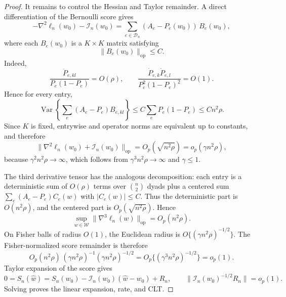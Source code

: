 \documentclass[10pt,a4paper]{amsart}
\providecommand{\Var}{\operatorname{Var}}
\providecommand{\calI}{\mathcal I}
\providecommand{\calW}{\mathcal W}
\providecommand{\op}{\operatorname{op}}
\begin{document}
\begin{proof}
It remains to control the Hessian and Taylor remainder.  A direct
differentiation of the Bernoulli score gives
\[
  -\nabla^2\ell_n(w_0)-\calI_n(w_0)
  =
  \sum_{e\in\mathcal D_n}(A_e-P_e(w_0))\,B_e(w_0),
\]
where each \(B_e(w_0)\) is a \(K\times K\) matrix satisfying
\[
  \|B_e(w_0)\|_{\op}\le C.
\]
Indeed,
\[
  \frac{\ddot P_{e,kl}}{P_e(1-P_e)}=O(\rho),
  \qquad
  \frac{\dot P_{e,k}\dot P_{e,l}}{P_e^2(1-P_e)^2}=O(1).
\]
Hence for every entry,
\[
  \Var\!\left\{\sum_e(A_e-P_e)B_{e,kl}\right\}
  \le
  C\sum_eP_e(1-P_e)
  \le
  Cn^2\rho.
\]
Since \(K\) is fixed, entrywise and operator norms are equivalent up to
constants, and therefore
\[
  \|\nabla^2\ell_n(w_0)+\calI_n(w_0)\|_{\op}
  =
  O_p(\sqrt{n^2\rho})
  =
  o_p(\gamma n^2\rho),
\]
because \(\gamma^2n^2\rho\to\infty\), which follows from
\(\gamma^3n^2\rho\to\infty\) and \(\gamma\le1\).

The third derivative tensor has the analogous decomposition: each entry
is a deterministic sum of \(O(\rho)\) terms over \(\binom{n}{2}\) dyads plus a
centered sum \(\sum_e(A_e-P_e)C_e(w)\) with \(|C_e(w)|\le C\).  Thus the
deterministic part is \(O(n^2\rho)\), and the centered part is
\(O_p(\sqrt{n^2\rho})\).  Hence
\[
  \sup_{w\in\calW}\|\nabla^3\ell_n(w)\|_{\op}
  =
  O_p(n^2\rho).
\]
On Fisher balls of radius \(O(1)\), the Euclidean radius is
\(O\{(\gamma n^2\rho)^{-1/2}\}\).  The Fisher-normalized score remainder
is therefore
\[
  O_p(n^2\rho)\,(\gamma n^2\rho)^{-1}
  (\gamma n^2\rho)^{-1/2}
  =
  O_p\{(\gamma^3n^2\rho)^{-1/2}\}
  =
  o_p(1).
\]
Taylor expansion of the score gives
\[
  0=S_n(\widehat w)
  =
  S_n(w_0)-\calI_n(w_0)(\widehat w-w_0)+R_n,
  \qquad
  \|\calI_n(w_0)^{-1/2}R_n\|=o_p(1).
\]
Solving proves the linear expansion, rate, and CLT.
\end{proof}
\end{document}
